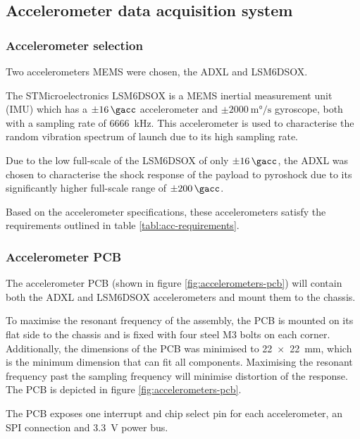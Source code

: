 \documentclass[]{report}
\begin{document}
\subsection{Accelerometer data acquisition system}
\subsubsection{Accelerometer selection}

Two accelerometers MEMS were chosen, the ADXL and LSM6\-DSOX.

The STMicroelectronics LSM6\-DSOX is a MEMS inertial measurement unit (IMU) which has a $\pm\SI{16}{\gacc}$ accelerometer and $\pm\SI{2000}{\milli\degree\per\second}$ gyroscope, both with a sampling rate of \SI{6666}{\kilo\hertz}. This accelerometer is used to characterise the random vibration spectrum of launch due to its high sampling rate.

Due to the low full-scale of the LSM6\-DSOX of only $\pm\SI{16}{\gacc}$, the ADXL was chosen to characterise the shock response of the payload to pyroshock due to its significantly higher full-scale range of $\pm\SI{200}{\gacc}$.

Based on the accelerometer specifications, these accelerometers satisfy the requirements outlined in table \ref{tabl:acc-requirements}.

\subsubsection{Accelerometer PCB}

The accelerometer PCB (shown in figure \ref{fig:accelerometers-pcb}) will contain both the ADXL and LSM6\-DSOX accelerometers and mount them to the chassis.

To maximise the resonant frequency of the assembly, the PCB is mounted on its flat side to the chassis and is fixed with four steel M3 bolts on each corner. Additionally, the dimensions of the PCB was minimised to \SI{22x22}{\milli\metre}, which is the minimum dimension that can fit all components. Maximising the resonant frequency past the sampling frequency will minimise distortion of the response. The PCB is depicted in figure \ref{fig:accelerometers-pcb}.

The PCB exposes one interrupt and chip select pin for each accelerometer, an SPI connection and \SI{3.3}{\volt} power bus.
\end{document}

